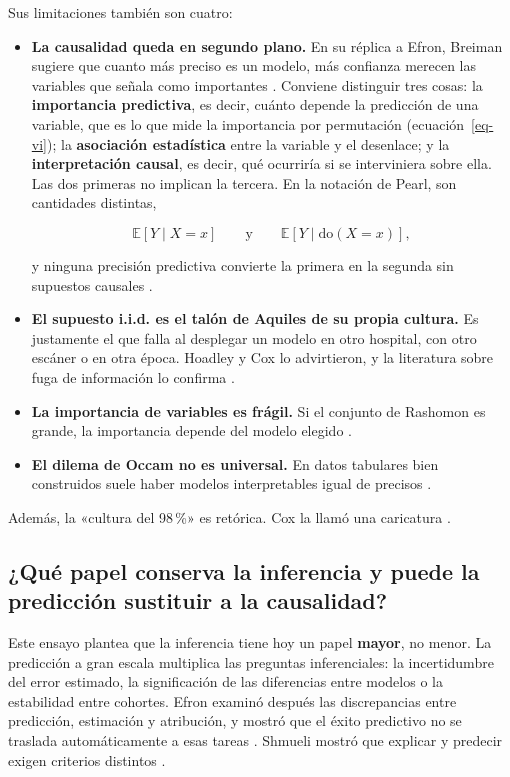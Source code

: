 \documentclass[11pt,a4paper]{article}
\begin{document}
Sus limitaciones también son cuatro:

\begin{itemize}
\item
  \textbf{La causalidad queda en segundo plano.} En su réplica a Efron, Breiman sugiere que cuanto más preciso es un modelo, más confianza merecen las variables que señala como importantes \autocite[229]{breiman2001}. Conviene distinguir tres cosas: la \textbf{importancia predictiva}, es decir, cuánto depende la predicción de una variable, que es lo que mide la importancia por permutación (ecuación~\eqref{eq-vi}); la \textbf{asociación estadística} entre la variable y el desenlace; y la \textbf{interpretación causal}, es decir, qué ocurriría si se interviniera sobre ella. Las dos primeras no implican la tercera. En la notación de Pearl, son cantidades distintas,

  \begin{equation}\label{eq-do}
  \mathbb{E}[Y \mid X = x] \qquad \text{y} \qquad \mathbb{E}[Y \mid \mathrm{do}(X = x)],
  \end{equation}

  y ninguna precisión predictiva convierte la primera en la segunda sin supuestos causales \autocite{pearl2009,hernan2020}.
\item
  \textbf{El supuesto i.i.d. es el talón de Aquiles de su propia cultura.} Es justamente el que falla al desplegar un modelo en otro hospital, con otro escáner o en otra época. Hoadley y Cox lo advirtieron, y la literatura sobre fuga de información lo confirma \autocite{kapoor2023,damour2022}.
\item
  \textbf{La importancia de variables es frágil.} Si el conjunto de Rashomon es grande, la importancia depende del modelo elegido \autocite{fisher2019}.
\item
  \textbf{El dilema de Occam no es universal.} En datos tabulares bien construidos suele haber modelos interpretables igual de precisos \autocite{rudin2019}.
\end{itemize}

Además, la «cultura del 98\,\%» es retórica. Cox la llamó una caricatura \autocite[216]{breiman2001}.

\subsection{¿Qué papel conserva la inferencia y puede la predicción sustituir a la causalidad?}

Este ensayo plantea que la inferencia tiene hoy un papel \textbf{mayor}, no menor. La predicción a gran escala multiplica las preguntas inferenciales: la incertidumbre del error estimado, la significación de las diferencias entre modelos o la estabilidad entre cohortes. Efron examinó después las discrepancias entre predicción, estimación y atribución, y mostró que el éxito predictivo no se traslada automáticamente a esas tareas \autocite{efron2020}. Shmueli mostró que explicar y predecir exigen criterios distintos \autocite{shmueli2010}.
\end{document}
